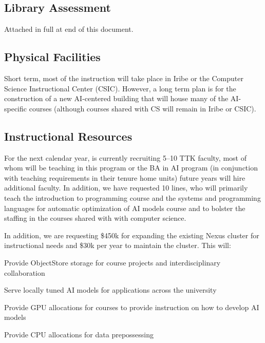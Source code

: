 
\newcommand{\ptkfaculty}{10}
\newcommand{\ttkfaculty}{5--10}
\newcommand{\advisors}{5}
\newcommand{\admin}{1}
\newcommand{\cloud}{30k}
\newcommand{\upfrontcluster}{450k}
\newcommand{\continuingcluster}{30k}

\subsection{Library Assessment}

Attached in full at end of this document.

\subsection{Physical Facilities}

Short term, most of the instruction will take place in Iribe or the Computer Science Instructional Center (CSIC).  However, a long term plan is for the construction of a new AI-centered building that will house many of the AI-specific courses (although courses shared with CS will remain in Iribe or CSIC).

\subsection{Instructional Resources}

For the next calendar year, \aim{} is currently recruiting \ttkfaculty{} TTK faculty, most of whom will be teaching in this program or the BA in AI program (in conjunction with teaching requirements in their tenure home units) future years will hire additional faculty.  In addition, we have requested \ptkfaculty{} lines, who will primarily teach the introduction to programming course and the systems and programming languages for automatic optimization of AI models course and to bolster the staffing in the courses shared with with computer science.

In addition, we are requesting \$\upfrontcluster{} for expanding the existing Nexus cluster for instructional needs and \$\continuingcluster{} per year to maintain the cluster.  This will:
\begin{itemize*}
    \item Provide ObjectStore storage for course projects and interdisciplinary collaboration
    \item Serve locally tuned AI models for applications across the university
    \item Provide GPU allocations for courses to provide instruction on how to develop AI models
    \item Provide CPU allocations for data prepossessing
\end{itemize*}

